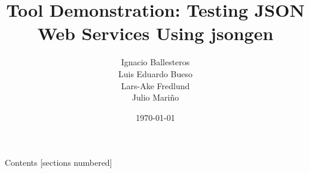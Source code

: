 \documentclass[10pt]{beamer}
\title{Tool Demonstration: Testing JSON Web Services Using jsongen}
\date{\today}
\author{
  Ignacio Ballesteros\\
  Luis Eduardo Bueso\\
  Lars-Ake Fredlund\\
  Julio Mariño
}
\institute{UPM}
\begin{document}
\maketitle

\begin{frame}{Contents}
  [sections numbered]
  \tableofcontents[hideallsubsections]
\end{frame}








\end{document}
